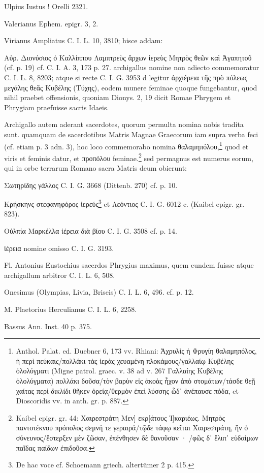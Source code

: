 \documentclass[a4paper, 11pt, oneside, polutonikogreek, german, twocolumn]{article}
\begin{document}
Ulpius Iustus ! Orelli 2321.

Valerianus Ephem. epigr. 3, 2.

Virianus Ampliatus C. I. L. 10, 3810; hisce addam:

Αὐρ. Διονύσιος ὁ Καλλίππου Λαμπτρεὺς ἄρχων ἱερεὺς Μητρὸς θεῶν καὶ Ἀγαπητοῦ (cf. p. 19) cf. C. I. A. 3, 173 p. 27. archigallus nomine non adiecto commemoratur C. I. L. 8, 8203; atque si recte C. I. G. 3953 d legitur ἀρχιέρεια τῆς πρὸ πόλεως μεγάλης θεᾶς Κυβέλης (Τύχης), eodem munere feminae quoque fungebantur, quod nihil praebet offensionis, quoniam Dionys. 2, 19 dicit Romae Phrygem et Phrygiam praefuisse sacris Idaeis.

Archigallo autem aderant sacerdotes, quorum permulta nomina nobis tradita sunt. quamquam de sacerdotibus Matris Magnae Graecorum iam supra verba feci (cf. etiam p. 3 adn. 3), hoc loco commemorabo nomina θαλαμηπόλου,\footnote{Anthol. Palat. ed. Duebner 6, 173 vv. Rhiani: Ἀχρυλὶς ἡ Φρυγίη θαλαμηπόλος, ἡ περὶ πεύκαις/πολλάκι τὰς ἱερὰς χευαμένη πλοκάμους/γαλλαίῳ Κυβέλης ὀλολύγματι (Migne patrol. graec. v. 38 ad v. 267 Γαλλαίης Κυβέλης ὀλολύγματα) πολλάκι δοῦσα/τὸν βαρὺν εἰς ἀκοὰς ἦχον ἀπὸ στομάτων/τάσδε θεῇ χαίτας περὶ δικλίδι θῆκεν ὀρείᾳ/θερμὸν ἐπεὶ λύσσης ὧδ᾽ ἀνέπαυσε πόδα, et Dioscoridis vv. in anth. gr. p. 887.} quod et viris et feminis datur, et προπόλου feminae.\footnote{Kaibel epigr. gr. 44: Χαιρεστράτη Μεν] εκρ[άτους Ἰ]καριέως. Μητρὸς παντοτέκνου πρόπολος σεμνή τε γεραιρά/τῷδε τάφῳ κεῖται Χαιρεστράτη, ἣν ὁ σύνευνος/ἔστερξεν μὲν ζῶσαν, ἐπένθησεν δὲ θανοῦσαν · /φῶς δ᾽ ἔλιπ᾽ εὐδαίμων παῖδας παίδων ἐπιδοῦσα.} sed permagnus est numerus eorum, qui in orbe terrarum Romano sacra Matris deum obierunt:

Σωτηρίδης γάλλος C. I. G. 3668 (Dittenb. 270) cf. p. 10.

Κρήσκηνς στεφανηφόρος ἱερεύς\footnote{De hac voce cf. Schoemann griech. altertümer 2 p. 415.} et Λεόντιος C. I. G. 6012 c. (Kaibel epigr. gr. 823).

Οὐλπία Μαρκέλλα ἱέρεια διὰ βίου C. I. G. 3508 cf. p. 14.

ἱέρεια nomine omisso C. I. G. 3193.

Fl. Antonius Eustochius sacerdos Phrygius maximus, quem eundem fuisse atque archigallum arbitror C. I. L. 6, 508.

Onesimus (Olympias, Livia, Briseis) C. I. L. 6, 496. cf. p. 12.

M. Plaetorius Herculianus C. I. L. 6, 2258.

Bassus Ann. Inst. 40 p. 375.
\end{document}
